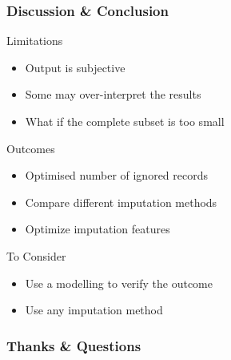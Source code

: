 \documentclass{beamer}
\newcommand{\myemph}[1]{{\bf {\color{emcolor}{#1}}}}
\begin{document}
\begin{frame}
  \frametitle{Discussion \& Conclusion}
  Limitations
  \begin{itemize}
    \item Output is subjective 
    \item Some may over-interpret the results
    \item What if the complete subset is too small
  \end{itemize}
  Outcomes
  \begin{itemize}
    \item Optimised number of ignored records 
    \item Compare different imputation methods
    \item Optimize imputation features
  \end{itemize}
  To Consider
  \begin{itemize}
    \item Use a modelling to verify the outcome 
    \item Use any imputation method
  \end{itemize}
\end{frame}



\begin{frame}
\frametitle{Thanks \& Questions}
\centerline{\Huge \myemph{Thanks for your attention!}}
\centerline{\Huge \myemph{Question \& Comments }}
\end{frame}
\end{document}
